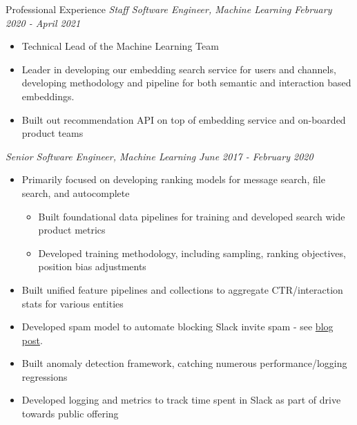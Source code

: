\documentclass{resume} %
\begin{document}
\begin{rSection}{Professional Experience}
{\em Staff Software Engineer, Machine Learning} \hfill {\em February 2020 - April 2021} \vspace{0.1em} 
\begin{itemize} \itemsep -0.2em
	\item Technical Lead of the Machine Learning Team
	\item Leader in developing our embedding search service for users and channels, developing methodology and pipeline for both semantic and interaction based embeddings.
	\item Built out recommendation API on top of embedding service and on-boarded product teams
\end{itemize} 
{\em Senior Software Engineer, Machine Learning} \hfill {\em June 2017 - February 2020} \vspace{0.1em} 
\begin{itemize} \itemsep -0.2em
	\item Primarily focused on developing ranking models for message search, file search, and autocomplete
	\vspace{-0.2em}
        \begin{itemize} \itemsep -0.2em
        	\item Built foundational data pipelines for training and developed search wide product metrics
        	\item Developed training methodology, including sampling, ranking objectives, position bias adjustments
		\end{itemize}
	\item Built unified feature pipelines and collections to aggregate CTR/interaction stats for various entities
	\item Developed spam model to automate blocking Slack invite spam - see \href{https://slack.engineering/blocking-slack-invite-spam-with-machine-learning/}{blog post}.
	\item Built anomaly detection framework, catching numerous performance/logging regressions
	\item Developed logging and metrics to track time spent in Slack as part of drive towards public offering
\end{itemize}


\end{rSection}
\end{document}
